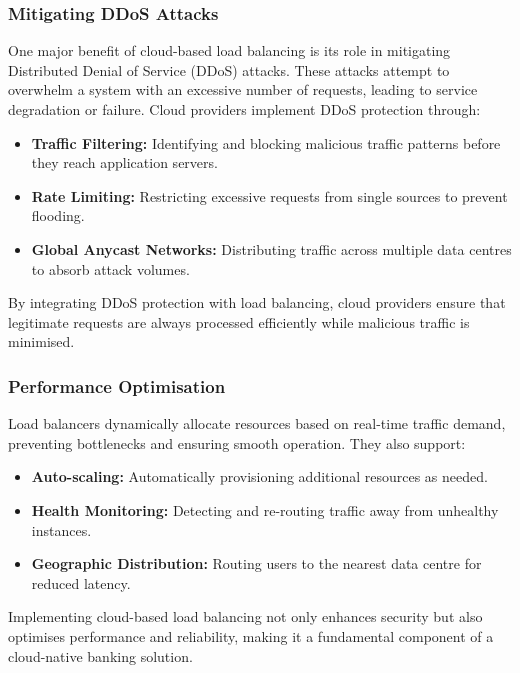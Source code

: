 \documentclass{article}
\begin{document}
	\subsubsection{Mitigating DDoS Attacks}
	\label{sec:mitigatingddos}
	\par One major benefit of cloud-based load balancing is its role in mitigating Distributed Denial of Service (DDoS) attacks. These attacks attempt to overwhelm a system with an excessive number of requests, leading to service degradation or failure. Cloud providers implement DDoS protection through:
	\begin{itemize}
		\item \textbf{Traffic Filtering:} Identifying and blocking malicious traffic patterns before they reach application servers.
		\item \textbf{Rate Limiting:} Restricting excessive requests from single sources to prevent flooding.
		\item \textbf{Global Anycast Networks:} Distributing traffic across multiple data centres to absorb attack volumes.
	\end{itemize}
	\par By integrating DDoS protection with load balancing, cloud providers ensure that legitimate requests are always processed efficiently while malicious traffic is minimised.
	\subsubsection{Performance Optimisation}
	\par Load balancers dynamically allocate resources based on real-time traffic demand, preventing bottlenecks and ensuring smooth operation. They also support:
	\begin{itemize}
		\item \textbf{Auto-scaling:} Automatically provisioning additional resources as needed.
		\item \textbf{Health Monitoring:} Detecting and re-routing traffic away from unhealthy instances.
		\item \textbf{Geographic Distribution:} Routing users to the nearest data centre for reduced latency.
	\end{itemize}
	\par Implementing cloud-based load balancing not only enhances security but also optimises performance and reliability, making it a fundamental component of a cloud-native banking solution.
\end{document}

